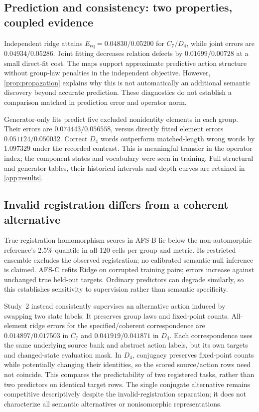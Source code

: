 \documentclass[10pt]{article}
\newcommand{\Eeq}{E_{\mathrm{eq}}}
\begin{document}
\subsection{Prediction and consistency: two properties, coupled evidence}
Independent ridge attains $\Eeq=0.04830/0.05200$ for $C_7/D_4$, while joint errors are $0.04934/0.05286$. Joint fitting decreases relation defects by $0.01699/0.00728$ at a small direct-fit cost. The maps support approximate predictive action structure without group-law penalties in the independent objective. However, \cref{prop:propagation} explains why this is not automatically an additional semantic discovery beyond accurate prediction. These diagnostics do not establish a comparison matched in prediction error and operator norm.

Generator-only fits predict five excluded nonidentity elements in each group. Their errors are $0.074443/0.056558$, versus directly fitted element errors $0.051124/0.050032$. Correct $D_4$ words outperform matched-length wrong words by $1.097329$ under the recorded contrast. This is meaningful transfer in the operator index; the component states and vocabulary were seen in training. Full structural and generator tables, their historical intervals and depth curves are retained in \cref{app:results}.

\subsection{Invalid registration differs from a coherent alternative}
True-registration homomorphism scores in AFS-B lie below the non-automorphic reference's 2.5\% quantile in all 120 cells per group and metric. Its restricted ensemble excludes the observed registration; no calibrated semantic-null inference is claimed. AFS-C refits Ridge on corrupted training pairs; errors increase against unchanged true held-out targets. Ordinary predictors can degrade similarly, so this establishes sensitivity to supervision rather than semantic specificity.

Study~2 instead consistently supervises an alternative action induced by swapping two state labels. It preserves group laws and fixed-point counts. All-element ridge errors for the specified/coherent correspondence are $0.014897/0.017503$ in $C_7$ and $0.041919/0.041871$ in $D_4$. Each correspondence uses the same underlying source bank and abstract action labels, but its own targets and changed-state evaluation mask. In $D_4$, conjugacy preserves fixed-point counts while potentially changing their identities, so the scored source/action rows need not coincide. This compares the predictability of two registered tasks, rather than two predictors on identical target rows. The single conjugate alternative remains competitive descriptively despite the invalid-registration separation; it does not characterize all semantic alternatives or nonisomorphic representations.
\end{document}
